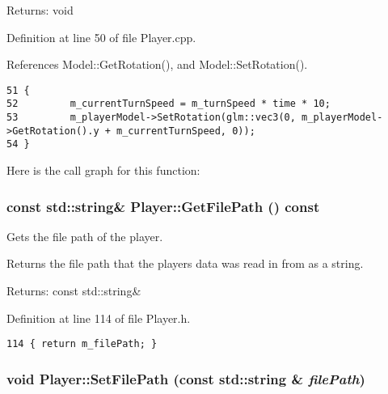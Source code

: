 \begin{Desc}
\item[Returns:]void \end{Desc}


Definition at line 50 of file Player.cpp.

References Model::GetRotation(), and Model::SetRotation().

\begin{Code}\begin{verbatim}51 {
52         m_currentTurnSpeed = m_turnSpeed * time * 10;
53         m_playerModel->SetRotation(glm::vec3(0, m_playerModel->GetRotation().y + m_currentTurnSpeed, 0));
54 }\end{verbatim}
\end{Code}




Here is the call graph for this function:\hypertarget{class_player_42cc1504610f6ceff2eed808b5e6edf5}{
\subsubsection[GetFilePath]{\setlength{\rightskip}{0pt plus 5cm}const std::string\& Player::GetFilePath () const}}
\label{class_player_42cc1504610f6ceff2eed808b5e6edf5}


Gets the file path of the player. 

Returns the file path that the players data was read in from as a string.

\begin{Desc}
\item[Returns:]const std::string\& \end{Desc}


Definition at line 114 of file Player.h.

\begin{Code}\begin{verbatim}114 { return m_filePath; }
\end{verbatim}
\end{Code}


\hypertarget{class_player_033b610c332fd8266d403d8383a4f869}{
\subsubsection[SetFilePath]{\setlength{\rightskip}{0pt plus 5cm}void Player::SetFilePath (const std::string \& {\em filePath})}}
\label{class_player_033b610c332fd8266d403d8383a4f869}


